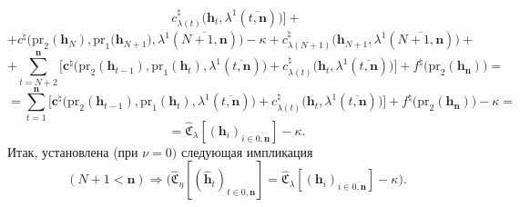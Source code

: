 \documentclass[11pt,twoside,openany]{report}
\newcommand{\bfn}{\begin{equation}}
\newcommand{\efn}{\end{equation}}
\newcommand{\ov}{\overline}
\newcommand{\la}{\lambda}
\newcommand{\nn}{{\mathbf n}}
\begin{document}
{{$$c_{\la(t)}^\natural\bigl(\mathbf{h}_t,\la^1(\ov{t,\mathbf{n}})\bigl)\bigl] +
$$
$$
+ c^\natural\bigl(\mathrm{pr}_2(\mathbf{h}_N),\mathrm{pr}_1\bigl(\mathbf{h}_{N+1}),
\la^1(\ov{N+1,\mathbf{n}})\bigl) - \kappa +
c_{\la(N+1)}^\natural\bigl(\mathbf{h}_{N+1},\la^1(\ov{N+1,\nn})\bigl)+ $$
$$
+ \sum\limits_{t=N+2}^\mathbf{n}\bigl[\mathbf{c}^\natural\bigl(\mathrm{pr}_2(\mathbf{h}_{t-1}),
\mathrm{pr}_1(\mathbf{h}_t),\la^1(\ov{t,\mathbf{n}})\bigl) + c_{\la(t)}^\natural\bigl(\mathbf{h}_t,
\la^1(\ov{t,\mathbf{n}})\bigl)\bigl] + f^\natural\bigl(\mathrm{pr}_2(\mathbf{h}_\mathbf{n})\bigl) =
$$
$$
= \sum\limits_{t=1}^\mathbf{n}\bigl[\mathbf{c}^\natural\bigl(\mathrm{pr}_2(\mathbf{h}_{t-1}),
\mathrm{pr}_1(\mathbf{h}_t),\la^1(\ov{t,\mathbf{n}})\bigl) +
c_{\la(t)}^\natural\bigl(\mathbf{h}_t,\la^1(\ov{t,\mathbf{n}})\bigl)\bigl] +
f^\natural\bigl(\mathrm{pr}_2(\mathbf{h}_\mathbf{n})\bigl) -\kappa =
$$
$$
= \widehat{\mathfrak{C}}_\la[(\mathbf{h}_i)_{i\in\ov{0,\mathbf{n}}}] - \kappa.
$$
Итак, установлена (при $\nu =0)$ следующая импликация
\bfn\label{4.5.49}
(N+1 < \mathbf{n}) \Longrightarrow \bigl(\widehat{\mathfrak{C}}_\eta[(\hat{\mathbf{h}}_t)_{t\in \ov{0,\mathbf{n}}}] =
\widehat{\mathfrak{C}}_\la[(\mathbf{h}_i)_{i\in \ov{0,\mathbf{n}}}] - \kappa\bigl).
\efn

}}
\end{document}
